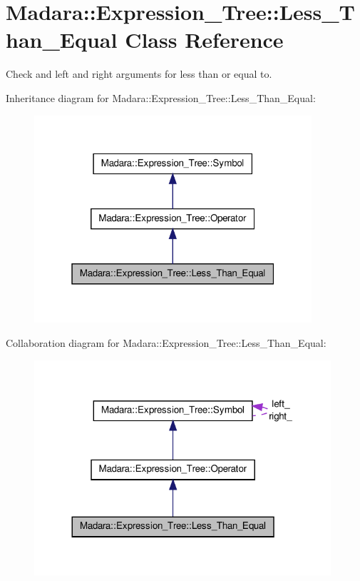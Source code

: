\hypertarget{classMadara_1_1Expression__Tree_1_1Less__Than__Equal}{
\section{Madara::Expression\_\-Tree::Less\_\-Than\_\-Equal Class Reference}
\label{d7/dcc/classMadara_1_1Expression__Tree_1_1Less__Than__Equal}
}


Check and left and right arguments for less than or equal to.  




Inheritance diagram for Madara::Expression\_\-Tree::Less\_\-Than\_\-Equal:
\nopagebreak
\begin{figure}[H]
\begin{center}
\leavevmode
\includegraphics[width=292pt]{d7/d9e/classMadara_1_1Expression__Tree_1_1Less__Than__Equal__inherit__graph}
\end{center}
\end{figure}


Collaboration diagram for Madara::Expression\_\-Tree::Less\_\-Than\_\-Equal:
\nopagebreak
\begin{figure}[H]
\begin{center}
\leavevmode
\includegraphics[width=312pt]{d4/d39/classMadara_1_1Expression__Tree_1_1Less__Than__Equal__coll__graph}
\end{center}
\end{figure}
